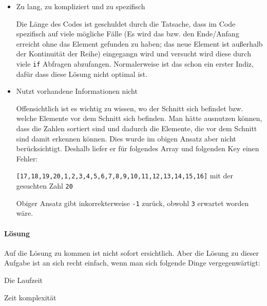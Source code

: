 \documentclass{book}
\begin{document}
\begin{itemize} 
	\item Zu lang, zu kompliziert und zu spezifisch
	
	Die Länge des Codes ist geschuldet durch die Tatsache, dass im Code spezifisch auf viele mögliche Fälle (Es wird das bzw. den Ende/Anfang erreicht ohne das Element gefunden zu haben; das neue Element ist außerhalb der Kontinuität der Reihe) eingegangn wird und versucht wird diese durch viele \lstinline|if| Abfragen abzufangen. Normalerweise ist das schon ein erster Indiz, dafür dass diese Lösung nicht optimal ist. 
	
	\item Nutzt vorhandene Informationen nicht
	
	Offensichtlich ist es wichtig zu wissen, wo der Schnitt sich befindet bzw. welche Elemente vor dem Schnitt sich befinden. Man hätte ausnutzen können, dass die Zahlen sortiert sind und dadurch die Elemente, die vor dem Schnitt sind damit erkennen können. Dies wurde im obigen Ansatz aber nicht berücksichtigt. Deshalb liefer er für folgendes Array und folgenden Key einen Fehler:
	
	 \lstinline|[17,18,19,20,1,2,3,4,5,6,7,8,9,10,11,12,13,14,15,16]| mit der gesuchten Zahl \lstinline|20|
	 
	 Obiger Ansatz gibt inkorrekterweise \lstinline|-1| zurück, obwohl \lstinline|3| erwartet worden wäre.
	
\end{itemize}
\paragraph{Lösung} Auf die Lösung zu kommen ist nicht sofort ersichtlich. Aber die Lösung zu dieser Aufgabe ist an sich recht einfach, wenn man sich folgende Dinge vergegenwärtigt:

Die Laufzeit

Zeit komplexität
\end{document}
